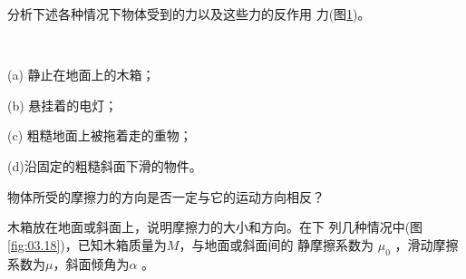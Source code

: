 \begin{questions}

  \question 分析下述各种情况下物体受到的力以及这些力的反作用
  力(图\ref{fig:03.17})。
  \begin{figure}[h]
    \vspace{-1.5em}
    \centering
     \hspace{4em}
    \setcounter{subfigure}{2}
    \\[1em]
    \setcounter{subfigure}{1}
     \hspace{4em}
    \setcounter{subfigure}{3}
    \caption{}
    \label{fig:03.17}
  \end{figure}

  (a) 静止在地面上的木箱；

  (b) 悬挂着的电灯；

  (c) 粗糙地面上被拖着走的重物；

  (d)沿固定的粗糙斜面下滑的物件。

  \question 物体所受的摩擦力的方向是否一定与它的运动方向相反？

  \question 木箱放在地面或斜面上，说明摩擦力的大小和方向。在下
  列几种情况中(图\ref{fig:03.18})，已知木箱质量为$ M $，与地面或斜面间的
  静摩擦系数为 $ \mu _ { 0 } $ ，滑动摩擦系数为$ \mu $，斜面倾角为$ \alpha $ 。


\end{questions}
